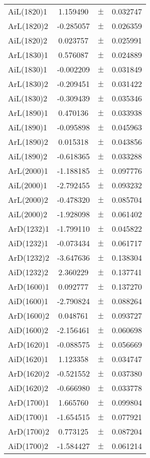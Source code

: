 \begin{table}
\begin{tiny}
\begin{tabular}{lccc}
AiL(1820)1 & 1.159490 & $\pm$ & 0.032747 \\
ArL(1820)2 & -0.285057 & $\pm$ & 0.026359 \\
AiL(1820)2 & 0.023757 & $\pm$ & 0.025991 \\
ArL(1830)1 & 0.576087 & $\pm$ & 0.024889 \\
AiL(1830)1 & -0.002209 & $\pm$ & 0.031849 \\
ArL(1830)2 & -0.209451 & $\pm$ & 0.031422 \\
AiL(1830)2 & -0.309439 & $\pm$ & 0.035346 \\
ArL(1890)1 & 0.470136 & $\pm$ & 0.033938 \\
AiL(1890)1 & -0.095898 & $\pm$ & 0.045963 \\
ArL(1890)2 & 0.015318 & $\pm$ & 0.043856 \\
AiL(1890)2 & -0.618365 & $\pm$ & 0.033288 \\
ArL(2000)1 & -1.188185 & $\pm$ & 0.097776 \\
AiL(2000)1 & -2.792455 & $\pm$ & 0.093232 \\
ArL(2000)2 & -0.478320 & $\pm$ & 0.085704 \\
AiL(2000)2 & -1.928098 & $\pm$ & 0.061402 \\
ArD(1232)1 & -1.799110 & $\pm$ & 0.045822 \\
AiD(1232)1 & -0.073434 & $\pm$ & 0.061717 \\
ArD(1232)2 & -3.647636 & $\pm$ & 0.138304 \\
AiD(1232)2 & 2.360229 & $\pm$ & 0.137741 \\
ArD(1600)1 & 0.092777 & $\pm$ & 0.137270 \\
AiD(1600)1 & -2.790824 & $\pm$ & 0.088264 \\
ArD(1600)2 & 0.048761 & $\pm$ & 0.093727 \\
AiD(1600)2 & -2.156461 & $\pm$ & 0.060698 \\
ArD(1620)1 & -0.088575 & $\pm$ & 0.056669 \\
AiD(1620)1 & 1.123358 & $\pm$ & 0.034747 \\
ArD(1620)2 & -0.521552 & $\pm$ & 0.037380 \\
AiD(1620)2 & -0.666980 & $\pm$ & 0.033778 \\
ArD(1700)1 & 1.665760 & $\pm$ & 0.099804 \\
AiD(1700)1 & -1.654515 & $\pm$ & 0.077921 \\
ArD(1700)2 & 0.773125 & $\pm$ & 0.087204 \\
AiD(1700)2 & -1.584427 & $\pm$ & 0.061214 \\
\bottomrule
\end{tabular}
\end{tiny}
\end{table}

